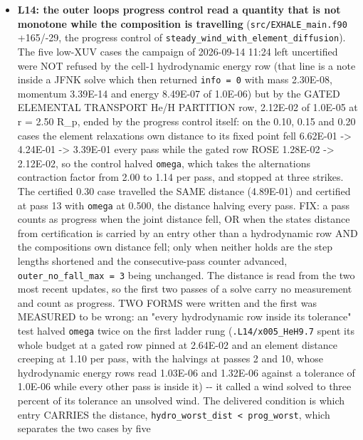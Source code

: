 \documentclass[english,a4paper]{my_memo}
\begin{document}
\begin{itemize}
  CERTIFIED (x0.15 at pass 9, log Mdot 7.04; x0.10 at pass 12, log Mdot
  6.85).
\item
  \textbf{L14: the outer loop\textquotesingle s progress control read a quantity that is not
  monotone while the composition is travelling} (\texttt{src/EXHALE\_main.f90}
  +165/-29, the progress control of \texttt{steady\_wind\_with\_element\_diffusion}).
  The five low-XUV cases the campaign of 2026-09-14 11:24 left uncertified
  were NOT refused by the cell-1 hydrodynamic energy row (that line is a note
  inside a JFNK solve which then returned \texttt{info\ =\ 0} with mass 2.30E-08,
  momentum 3.39E-14 and energy 8.49E-07 of 1.0E-06) but by the GATED
  ELEMENTAL TRANSPORT He/H PARTITION row, 2.12E-02 of 1.0E-05 at r = 2.50
  R\_p, ended by the progress control itself: on the 0.10, 0.15 and 0.20 cases
  the element relaxation\textquotesingle s own distance to its fixed point fell 6.62E-01 -\textgreater{}
  4.24E-01 -\textgreater{} 3.39E-01 every pass while the gated row ROSE 1.28E-02 -\textgreater{}
  2.12E-02, so the control halved \texttt{omega}, which takes the alternation\textquotesingle s
  contraction factor from 2.00 to 1.14 per pass, and stopped at three
  strikes. The certified 0.30 case travelled the SAME distance (4.89E-01) and
  certified at pass 13 with \texttt{omega} at 0.500, the distance halving every
  pass. FIX: a pass counts as progress when the joint distance fell, OR when
  the state\textquotesingle s distance from certification is carried by an entry other than a
  hydrodynamic row AND the composition\textquotesingle s own distance fell; only when neither
  holds are the step lengths shortened and the consecutive-pass counter
  advanced, \texttt{outer\_no\_fall\_max\ =\ 3} being unchanged. The distance is read
  from the two most recent updates, so the first two passes of a solve carry
  no measurement and count as progress. TWO FORMS were written and the first
  was MEASURED to be wrong: an "every hydrodynamic row inside its tolerance"
  test halved \texttt{omega} twice on the first ladder rung (\texttt{.L14/x005\_HeH9.7}
  spent its whole budget at a gated row pinned at 2.64E-02 and an element
  distance creeping at 1.10 per pass, with the halvings at passes 2 and 10,
  whose hydrodynamic energy rows read 1.03E-06 and 1.32E-06 against a
  tolerance of 1.0E-06 while every other pass is inside it) -\/- it called a
  wind solved to three percent of its tolerance an unsolved wind. The
  delivered condition is which entry CARRIES the distance,
  \texttt{hydro\_worst\_dist\ \textless{}\ prog\_worst}, which separates the two cases by five

\end{itemize}
\end{document}
